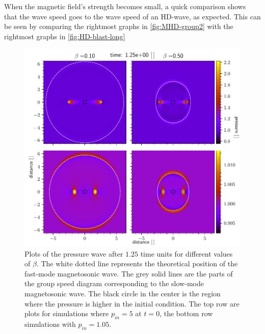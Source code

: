 When the magnetic field's strength becomes small, a quick comparison shows that the wave speed goes to the wave speed of an HD-wave, as expected.
This can be seen by comparing the rightmost graphs in \cref{fig:MHD-group2} with the rightmost graphs in \cref{fig:HD-blast-long}

\begin{figure}[H]
	\centering
	\includegraphics[width=\linewidth]{images/group-speed-pressure1.pdf}
	\caption{Plots of the pressure wave after $1.25$ time units for different values of $\beta$. 
	The white dotted line represents the theoretical position of the fast-mode magnetosonic wave.    		The grey solid lines are the parts of the group speed diagram corresponding to the slow-mode magnetosonic wave.
	The black circle in the center is the region where the pressure is higher in the initial condition.
	The top row are plots for simulations where $p_{in}=5$ at $t=0$, the bottom row simulations with $p_{in}=1.05$.}
	\label{fig:MHD-group1}
\end{figure}

